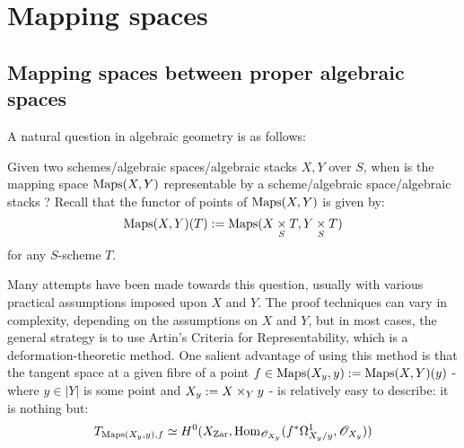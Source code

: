 \section{Mapping spaces}
    \subsection{Mapping spaces between proper algebraic spaces}
        A natural question in algebraic geometry is as follows:
        \begin{question}
            Given two schemes/algebraic spaces/algebraic stacks $X, Y$ over $S$, when is the mapping space $\mathrm{Maps}(X, Y)$ representable by a scheme/algebraic space/algebraic stacks ? Recall that the functor of points of $\mathrm{Maps}(X, Y)$ is given by:
                $$\Maps(X, Y)(T) := \Maps(X \x_S T, Y \x_S T)$$
            for any $S$-scheme $T$.
        \end{question}

        Many attempts have been made towards this question, usually with various practical assumptions imposed upon $X$ and $Y$. The proof techniques can vary in complexity, depending on the assumptions on $X$ and $Y$, but in most cases, the general strategy is to use Artin's Criteria for Representability, which is a deformation-theoretic method. One salient advantage of using this method is that the tangent space at a given fibre of a point $f \in \mathrm{Maps}(X_y, y) := \mathrm{Maps}(X, Y)(y)$ - where $y \in |Y|$ is some point and $X_y := X \x_Y y$ - is relatively easy to describe: it is nothing but:
            $$T_{\mathrm{Maps}(X_y, y), f} \simeq H^0(X_{\mathrm{Zar}}, \mathrm{Hom}_{\mathscr{O}_{X_y}}( f^*\Omega^1_{X_y/y}, \mathscr{O}_{X_y} ))$$
        
